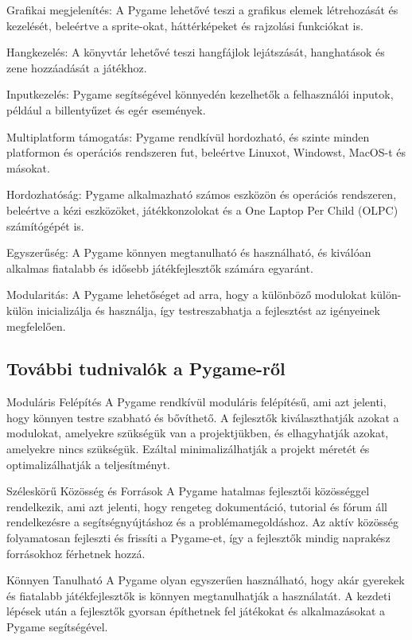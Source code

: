 Grafikai megjelenítés: A Pygame lehetővé teszi a grafikus elemek létrehozását és kezelését, beleértve a sprite-okat, háttérképeket és rajzolási funkciókat is.

Hangkezelés: A könyvtár lehetővé teszi hangfájlok lejátszását, hanghatások és zene hozzáadását a játékhoz.

Inputkezelés: Pygame segítségével könnyedén kezelhetők a felhasználói inputok, például a billentyűzet és egér események.

Multiplatform támogatás: Pygame rendkívül hordozható, és szinte minden platformon és operációs rendszeren fut, beleértve Linuxot, Windowst, MacOS-t és másokat.

Hordozhatóság: Pygame alkalmazható számos eszközön és operációs rendszeren, beleértve a kézi eszközöket, játékkonzolokat és a One Laptop Per Child (OLPC) számítógépét is.

Egyszerűség: A Pygame könnyen megtanulható és használható, és kiválóan alkalmas fiatalabb és idősebb játékfejlesztők számára egyaránt.

Modularitás: A Pygame lehetőséget ad arra, hogy a különböző modulokat külön-külön inicializálja és használja, így testreszabhatja a fejlesztést az igényeinek megfelelően.

\subsection{További tudnivalók a Pygame-ről}

Moduláris Felépítés
A Pygame rendkívül moduláris felépítésű, ami azt jelenti, hogy könnyen testre szabható és bővíthető. A fejlesztők kiválaszthatják azokat a modulokat, amelyekre szükségük van a projektjükben, és elhagyhatják azokat, amelyekre nincs szükségük. Ezáltal minimalizálhatják a projekt méretét és optimalizálhatják a teljesítményt.

Széleskörű Közösség és Források
A Pygame hatalmas fejlesztői közösséggel rendelkezik, ami azt jelenti, hogy rengeteg dokumentáció, tutorial és fórum áll rendelkezésre a segítségnyújtáshoz és a problémamegoldáshoz. Az aktív közösség folyamatosan fejleszti és frissíti a Pygame-et, így a fejlesztők mindig naprakész forrásokhoz férhetnek hozzá.

Könnyen Tanulható
A Pygame olyan egyszerűen használható, hogy akár gyerekek és fiatalabb játékfejlesztők is könnyen megtanulhatják a használatát. A kezdeti lépések után a fejlesztők gyorsan építhetnek fel játékokat és alkalmazásokat a Pygame segítségével.


